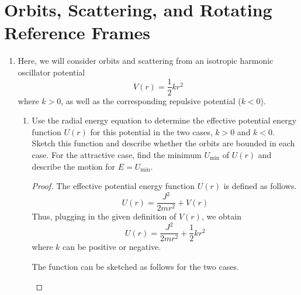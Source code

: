 \documentclass[../psets.tex]{subfiles}
\begin{document}
\section{Orbits, Scattering, and Rotating Reference Frames}
\begin{enumerate}
    \item {}Here, we will consider orbits and scattering from an isotropic harmonic oscillator potential
    \begin{equation*}
        V(r) = \frac{1}{2}kr^2
    \end{equation*}
    where $k>0$, as well as the corresponding repulsive potential ($k<0$).
    \begin{enumerate}
        \item Use the radial energy equation to determine the effective potential energy function $U(r)$ for this potential in the two cases, $k>0$ and $k<0$. Sketch this function and describe whether the orbits are bounded in each case. For the attractive case, find the minimum $U_\text{min}$ of $U(r)$ and describe the motion for $E=U_\text{min}$.
        \begin{proof}
            The effective potential energy function $U(r)$ is defined as follows.
            \begin{equation*}
                U(r) = \frac{J^2}{2mr^2}+V(r)
            \end{equation*}
            Thus, plugging in the given definition of $V(r)$, we obtain
            \begin{equation*}
                \boxed{U(r) = \frac{J^2}{2mr^2}+\frac{1}{2}kr^2}
            \end{equation*}
            where $k$ can be positive or negative.\par
            The function can be sketched as follows for the two cases.
            \begin{figure}[H]
                \centering
                \begin{subfigure}[b]{0.25\linewidth}
                    \centering
\end{subfigure}
\end{figure}
\end{proof}
\end{enumerate}
\end{enumerate}
\end{document}
